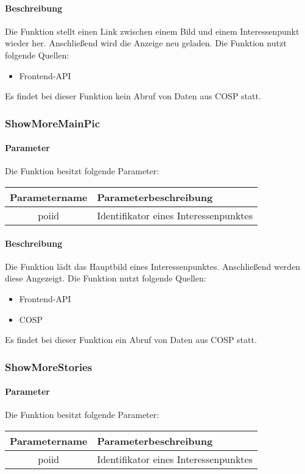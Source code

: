 \paragraph{Beschreibung} Die Funktion stellt einen Link zwischen einem Bild und einem Interessenpunkt wieder her. Anschließend wird die Anzeige neu geladen. Die Funktion nutzt folgende Quellen:
\begin{itemize}
	\item Frontend-API
\end{itemize}
Es findet bei dieser Funktion kein Abruf von Daten aus {\glqq COSP\grqq} statt.
\subsubsection{ShowMoreMainPic}
\paragraph{Parameter} Die Funktion besitzt folgende Parameter:
\begin{table}[H]
	\begin{tabular}{|c|p{11cm}|}
		\hline
		\textbf{Parametername} & \textbf{Parameterbeschreibung} \\ \hline
		poiid & Identifikator eines Interessenpunktes \\ \hline
	\end{tabular}
\end{table}
\paragraph{Beschreibung} Die Funktion lädt das Hauptbild eines Interessenpunktes. Anschließend werden diese Angezeigt. Die Funktion nutzt folgende Quellen:
\begin{itemize}
	\item Frontend-API
	\item COSP
\end{itemize}
Es findet bei dieser Funktion ein Abruf von Daten aus {\glqq COSP\grqq} statt.
\subsubsection{ShowMoreStories}
\paragraph{Parameter} Die Funktion besitzt folgende Parameter:
\begin{table}[H]
	\begin{tabular}{|c|p{11cm}|}
		\hline
		\textbf{Parametername} & \textbf{Parameterbeschreibung} \\ \hline
		poiid & Identifikator eines Interessenpunktes \\ \hline
	\end{tabular}
\end{table}
